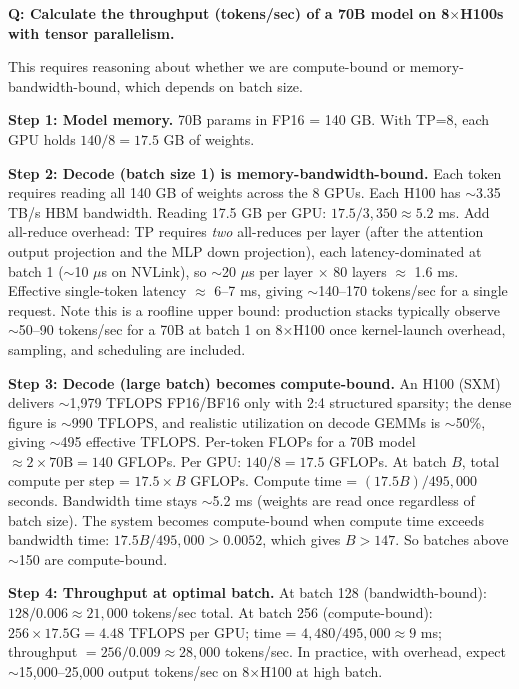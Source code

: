\begin{interviewq}
\textbf{Q: Calculate the throughput (tokens/sec) of a 70B model on 8$\times$H100s with tensor parallelism.}

 \quad {} \quad \badgefreq{\freqmed}

\stronganswer

This requires reasoning about whether we are compute-bound or memory-bandwidth-bound, which depends on batch size.

\textbf{Step 1: Model memory.} 70B params in FP16 = 140 GB. With TP=8, each GPU holds $140/8 = 17.5$ GB of weights.

\textbf{Step 2: Decode (batch size 1) is memory-bandwidth-bound.} Each token requires reading all 140 GB of weights across the 8 GPUs. Each H100 has $\sim$3.35 TB/s HBM bandwidth. Reading 17.5 GB per GPU: $17.5 / 3{,}350 \approx 5.2$ ms. Add all-reduce overhead: TP requires \textit{two} all-reduces per layer (after the attention output projection and the MLP down projection), each latency-dominated at batch 1 ($\sim$10 $\mu$s on NVLink), so $\sim$20 $\mu$s per layer $\times$ 80 layers $\approx$ 1.6 ms. Effective single-token latency $\approx$ 6--7 ms, giving $\sim$140--170 tokens/sec for a single request. Note this is a roofline upper bound: production stacks typically observe $\sim$50--90 tokens/sec for a 70B at batch 1 on 8$\times$H100 once kernel-launch overhead, sampling, and scheduling are included.

\textbf{Step 3: Decode (large batch) becomes compute-bound.} An H100 (SXM) delivers $\sim$1{,}979 TFLOPS FP16/BF16 only with 2:4 structured sparsity; the dense figure is $\sim$990 TFLOPS, and realistic utilization on decode GEMMs is $\sim$50\%, giving $\sim$495 effective TFLOPS. Per-token FLOPs for a 70B model $\approx 2 \times 70\text{B} = 140$ GFLOPs. Per GPU: $140 / 8 = 17.5$ GFLOPs. At batch $B$, total compute per step = $17.5 \times B$ GFLOPs. Compute time = $(17.5B) / 495{,}000$ seconds. Bandwidth time stays $\sim$5.2 ms (weights are read once regardless of batch size). The system becomes compute-bound when compute time exceeds bandwidth time: $17.5B / 495{,}000 > 0.0052$, which gives $B > 147$. So batches above $\sim$150 are compute-bound.

\textbf{Step 4: Throughput at optimal batch.} At batch 128 (bandwidth-bound): $128 / 0.006 \approx 21{,}000$ tokens/sec total. At batch 256 (compute-bound): $256 \times 17.5\text{G} = 4.48$ TFLOPS per GPU; time = $4{,}480 / 495{,}000 \approx 9$ ms; throughput $= 256 / 0.009 \approx 28{,}000$ tokens/sec. In practice, with overhead, expect $\sim$15{,}000--25{,}000 output tokens/sec on 8$\times$H100 at high batch.


\end{interviewq}

